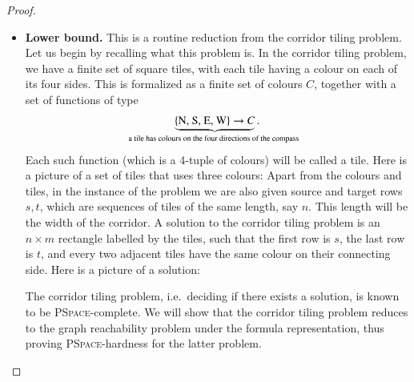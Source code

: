 \begin{proof}
\begin{itemize}
    \item \textbf{Lower bound.}  This is a routine reduction  from the corridor tiling problem. Let us begin by recalling what this problem is. In the corridor tiling problem, we have a finite set  of square tiles, with each tile having a colour on each of its four sides. This is formalized as a finite set of colours $C$, together with a set of functions of type 
    \begin{align*}
     \myunderbrace{\set{\text{N, S, E, W}} \to C}{a tile has colours on the four directions of the compass}.
    \end{align*}
    Each such function (which is a 4-tuple of colours)  will be called a tile.
    Here is a picture of a set of tiles that uses three colours:
    Apart from the colours and tiles, in the instance of the problem we are also  given source and target rows $s,t$, which are sequences of tiles of the same length, say $n$. This length will be the width of the corridor. A solution to the corridor tiling problem is an $n \times m$ rectangle labelled by the tiles, such that the first row is $s$, the last row is $t$, and every two adjacent tiles have the same colour on their connecting side. Here is a picture of a solution: 

    The corridor tiling problem, i.e.~deciding if there exists a solution, is known to be  \textsc{PSpace}-complete. We will show that the corridor tiling problem reduces to the graph reachability problem under the formula representation, thus proving \textsc{PSpace}-hardness for the latter problem. 
    

\end{itemize}
\end{proof}
